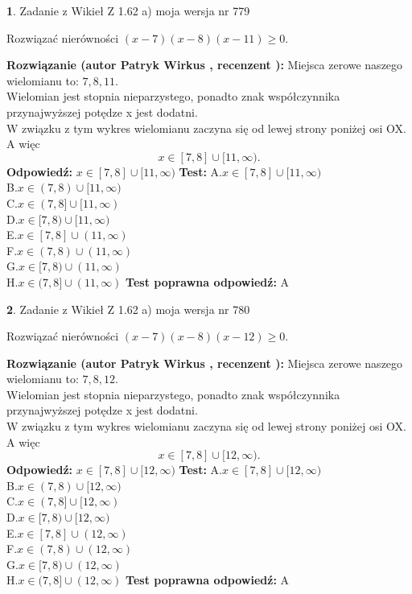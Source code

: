 \documentclass[12pt, a4paper]{article}
\theoremstyle{definition} %
\newtheorem{zad}{}
\newcommand{\zadStart}[1]{\begin{zad}#1\newline}
\newcommand{\zadStop}{\end{zad}}
\newcommand{\rozwStart}[2]{\noindent \textbf{Rozwiązanie (autor #1 , recenzent #2): }\newline}
\newcommand{\rozwStop}{\newline}
\newcommand{\odpStart}{\noindent \textbf{Odpowiedź:}\newline}
\newcommand{\odpStop}{\newline}
\newcommand{\testStart}{\noindent \textbf{Test:}\newline}
\newcommand{\testStop}{\newline}
\newcommand{\kluczStart}{\noindent \textbf{Test poprawna odpowiedź:}\newline}
\newcommand{\kluczStop}{\newline}
\begin{document}
\zadStart{Zadanie z Wikieł Z 1.62 a) moja wersja nr 779}

Rozwiązać nierówności $(x-7)(x-8)(x-11)\ge0$.
\zadStop
\rozwStart{Patryk Wirkus}{}
Miejsca zerowe naszego wielomianu to: $7, 8, 11$.\\
Wielomian jest stopnia nieparzystego, ponadto znak współczynnika przy\linebreak najwyższej potędze x jest dodatni.\\ W związku z tym wykres wielomianu zaczyna się od lewej strony poniżej osi OX. A więc $$x \in [7,8] \cup [11,\infty).$$
\rozwStop
\odpStart
$x \in [7,8] \cup [11,\infty)$
\odpStop
\testStart
A.$x \in [7,8] \cup [11,\infty)$\\
B.$x \in (7,8) \cup [11,\infty)$\\
C.$x \in (7,8] \cup [11,\infty)$\\
D.$x \in [7,8) \cup [11,\infty)$\\
E.$x \in [7,8] \cup (11,\infty)$\\
F.$x \in (7,8) \cup (11,\infty)$\\
G.$x \in [7,8) \cup (11,\infty)$\\
H.$x \in (7,8] \cup (11,\infty)$
\testStop
\kluczStart
A
\kluczStop



\zadStart{Zadanie z Wikieł Z 1.62 a) moja wersja nr 780}

Rozwiązać nierówności $(x-7)(x-8)(x-12)\ge0$.
\zadStop
\rozwStart{Patryk Wirkus}{}
Miejsca zerowe naszego wielomianu to: $7, 8, 12$.\\
Wielomian jest stopnia nieparzystego, ponadto znak współczynnika przy\linebreak najwyższej potędze x jest dodatni.\\ W związku z tym wykres wielomianu zaczyna się od lewej strony poniżej osi OX. A więc $$x \in [7,8] \cup [12,\infty).$$
\rozwStop
\odpStart
$x \in [7,8] \cup [12,\infty)$
\odpStop
\testStart
A.$x \in [7,8] \cup [12,\infty)$\\
B.$x \in (7,8) \cup [12,\infty)$\\
C.$x \in (7,8] \cup [12,\infty)$\\
D.$x \in [7,8) \cup [12,\infty)$\\
E.$x \in [7,8] \cup (12,\infty)$\\
F.$x \in (7,8) \cup (12,\infty)$\\
G.$x \in [7,8) \cup (12,\infty)$\\
H.$x \in (7,8] \cup (12,\infty)$
\testStop
\kluczStart
A
\kluczStop
\end{document}
